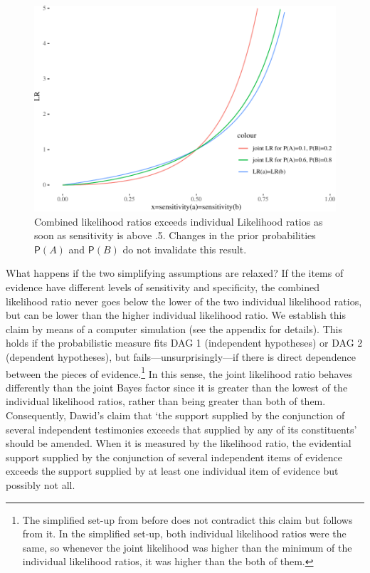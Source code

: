 \documentclass[
  10pt,
  dvipsnames,enabledeprecatedfontcommands]{scrartcl}
\newcommand{\pr}[1]{\ensuremath{\mathsf{P}(#1)}}
\begin{document}
\begin{figure}

\begin{center}\includegraphics[width=0.9\linewidth]{conjunction-paradox4_files/figure-latex/unnamed-chunk-3-1} \end{center}

\caption{Combined likelihood ratios exceeds individual Likelihood ratios as soon as sensitivity is above .5. Changes in the prior probabilities $\pr{A}$ and $\pr{B}$ do not invalidate this result.}
\label{fig:jointLRMarcello}
\end{figure}

What happens if the two simplifying assumptions are relaxed? If the
items of evidence have different levels of sensitivity and specificity,
the combined likelihood ratio never goes below the lower of the two
individual likelihood ratios, but can be lower than the higher
individual likelihood ratio. We establish this claim by means of a
computer simulation (see the appendix for details). This holds if the
probabilistic measure fits \textsf{DAG 1} (independent hypotheses) or
\textsf{DAG 2} (dependent hypotheses), but fails---unsurprisingly---if
there is direct dependence between the pieces of evidence.\footnote{The
  simplified set-up from before does not contradict this claim but
  follows from it. In the simplified set-up, both individual likelihood
  ratios were the same, so whenever the joint likelihood was higher than
  the minimum of the individual likelihood ratios, it was higher than
  the both of them.} In this sense, the joint likelihood ratio behaves
differently than the joint Bayes factor since it is greater than the
lowest of the individual likelihood ratios, rather than being greater
than both of them. Consequently, Dawid's claim that `the support
supplied by the conjunction of several independent testimonies exceeds
that supplied by any of its constituents' should be amended. When it is
measured by the likelihood ratio, the evidential support supplied by the
conjunction of several independent items of evidence exceeds the support
supplied by at least one individual item of evidence but possibly not
all.
\end{document}
